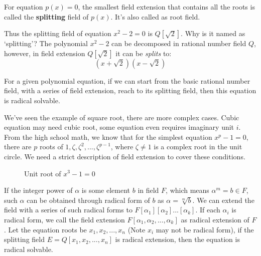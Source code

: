 \documentclass{article}
\begin{document}
 
\begin{definition}
For equation $p(x) = 0$, the smallest field extension that contains all the roots is called the \textbf{splitting} field of $p(x)$. It's also called as root field.
\end{definition}

Thus the splitting field of equation $x^2 -2 = 0$ is $Q[\sqrt{2}]$. Why is it named as `splitting'? The polynomial $x^2-2$ can be decomposed in rational number field $Q$, however, in field extension $Q[\sqrt{2}]$ it can be {\em splits} to:
\[
(x + \sqrt{2}) (x - \sqrt{2})
\]

For a given polynomial equation, if we can start from the basic rational number field, with a series of field extension, reach to its splitting field, then this equation is radical solvable.

We've seen the example of square root, there are more complex cases. Cubic equation may need cubic root, some equation even requires imaginary unit $i$. From the high school math, we know that for the simplest equation $x^p-1=0$, there are $p$ roots of $1, \zeta, \zeta^2, ..., \zeta^{p-1}$, where $\zeta \neq 1$ is a complex root in the unit circle. We need a strict description of field extension to cover these conditions.

\begin{figure}[htbp]
\centering
{}
\caption{Unit root of $x^3 - 1 = 0$}
\label{fig:root-of-unity}
\end{figure}

If the integer power of $\alpha$ is some element $b$ in field $F$, which means $\alpha^m = b \in F$, such $\alpha$ can be obtained through radical form of $b$ as $\alpha = \sqrt[m]{b}$. We can extend the field with a series of such radical forms to $F[\alpha_1][\alpha_2]...[\alpha_k]$. If each $\alpha_i$ is radical form, we call the field extension $F[\alpha_1, \alpha_2, ..., \alpha_k]$ as radical extension of $F$. Let the equation roots be $x_1, x_2, ..., x_n$ (Note $x_i$ may not be radical form), if the splitting field $E = Q[x_1, x_2, ..., x_n]$ is radical extension, then the equation is radical solvable.
\end{document}
